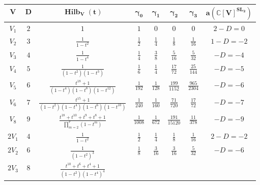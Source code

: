 \documentclass{amsart}
\theoremstyle{definition}
\theoremstyle{remark}
\newcommand{\C}{\mathbb{C}}
\newcommand{\SL}{\operatorname{SL}}
\newcommand{\bs}{\boldsymbol}
\newcommand{\Hilb}{\operatorname{Hilb}}
\begin{document}
\begin{table}[h]
\label{tab:Exceptions}
\begin{tabular}{|c|c|c|c|c|c|c|c|}
\hline
    $\bs{V}$    &   $\bs{D}$&   $\bs{\Hilb_V(t)}$
    &   $\bs{\gamma_0}$     &   $\bs{\gamma_1}$     &   $\bs{\gamma_2}$     &   $\bs{\gamma_3}$
    &   $\bs{a(\C[V]^{\SL_2})}$
\\ \hline\hline
    $V_1$       &   $2$     &   $1$
    &   $1$                 &   $0$                 &   $0$                 &   $0$
    &   $2 - D = 0$
\\ \hline
    $V_2$       &   $3$     &   $\frac{1}{1 - t^2}$
    &   $\frac{1}{2}$       &   $\frac{1}{4}$       &   $\frac{1}{8}$       &   $\frac{1}{16}$
    &   $1 - D = -2$
\\ \hline
    $V_3$       &   $4$     &   $\frac{1}{1 - t^4}$
    &   $\frac{1}{4}$       &   $\frac{3}{8}$       &   $\frac{5}{16}$      &   $\frac{5}{32}$
    &   $-D = -4$
\\ \hline
    $V_4$       &   $5$     &   $\frac{1}{(1 - t^2)(1 - t^3)}$
    &   $\frac{1}{6}$       &   $\frac{1}{4}$       &   $\frac{17}{72}$     &   $\frac{25}{144}$
    &   $-D = -5$
\\ \hline
    $V_5$       &   $6$     &   $\frac{t^{18} + 1}
                                    {(1 - t^4) (1 - t^8) (1 - t^{12})}$
    &   $\frac{1}{192}$     &   $\frac{1}{128}$     &   $\frac{199}{1152}$  &   $\frac{965}{2304}$
    &   $-D = -6$
\\ \hline
    $V_6$       &   $7$     &   $\frac{t^{15} + 1}
                                    {(1 - t^2) (1 - t^4) (1 - t^6) (1 - t^{10})}$
    &   $\frac{1}{240}$     &   $\frac{1}{160}$     &   $\frac{71}{720}$    &   $\frac{17}{72}$
    &   $-D = -7$
\\ \hline
    $V_8$       &   $9$     &   $\frac{t^{18} + t^{10} + t^9 + t^8 + 1}
                                    {\prod_{m=2}^7 (1 - t^m) }$
    &   $\frac{1}{1008}$    &   $\frac{1}{672}$     &   $\frac{191}{15120}$ &   $\frac{11}{378}$
    &   $-D = -9$
\\ \hline
    $2V_1$      &   $4$     &   $\frac{1}{1 - t^2}$
    &   $\frac{1}{2}$       &   $\frac{1}{4}$       &   $\frac{1}{8}$       &   $\frac{1}{16}$
    &   $2-D = -2$
\\ \hline
    $2V_2$      &   $6$     &   $\frac{1}{(1 - t^2)^3}$
    &   $\frac{1}{8}$       &   $\frac{3}{16}$      &   $\frac{3}{16}$      &   $\frac{5}{32}$
    &   $-D = -6$
\\ \hline
    $2V_3$      &   $8$     &   $\frac{t^{10} + t^6 + t^4 + 1}{(1 - t^2) (1 - t^4)^4}$

\end{tabular}
\end{table}
\end{document}
